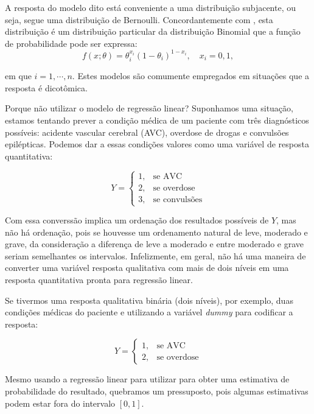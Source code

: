 \documentclass[
	12pt,				%
	openright,			%
	oneside,      %
	a4paper,			%
	english,			%
	french,				%
	spanish,			%
	brazil,				%
	]{abntex2}\usepackage[]{graphicx}\usepackage[table]{xcolor}
\theoremstyle{definition}
\begin{document}
A resposta do modelo dito está conveniente a uma distribuição subjacente, ou seja,
segue uma distribuição de Bernoulli. Concordantemente com \cite{bolfarine2001introduccao}, 
esta distribuição é um distribuição particular da distribuição Binomial que 
a função de probabilidade pode ser expressa:
\begin{equation}\label{bernoulli}
  f(x;\theta) = \theta_{i}^{x_i}(1 - \theta_{i})^{1 - x_i}, \quad x_i = 0,1,
\end{equation}

\noindent em que $i = 1,\cdots,n$. Estes modelos são comumente empregados em situações
que a resposta é dicotômica.

Porque não utilizar o modelo de regressão linear? Suponhamos uma situação, estamos 
tentando prever a condição médica de um paciente com três diagnósticos possíveis: 
acidente vascular cerebral (AVC), overdose de drogas e convulsões epilépticas. 
Podemos dar a essas condições valores como uma variável de resposta quantitativa:

$$Y = \left\{
\begin{array}{rcl}
1, & \textrm{se AVC}\\
2, & \textrm{se overdose}\\
3, & \textrm{se convulsões}
\end{array}
\right.$$

Com essa converssão implica um ordenação dos resultados possíveis de $Y$, mas 
não há ordenação, pois se houvesse um ordenamento natural de leve, moderado e 
grave, da consideração a diferença de leve a moderado e entre moderado e grave 
seriam semelhantes os intervalos. Infelizmente, em geral, não há uma maneira de converter
uma variável resposta qualitativa com mais de dois níveis em uma resposta quantitativa 
pronta para regressão linear.

Se tivermos uma resposta qualitativa binária (dois níveis), por exemplo, duas condições
médicas do paciente e utilizando a variável \textit{dummy} para codificar a resposta:

$$
Y = \left\{
\begin{array}{rcl}
1, & \textrm{se AVC}\\
2, & \textrm{se overdose}
\end{array}
\right.
$$

Mesmo usando a regressão linear para utilizar para obter uma estimativa de probabilidade
do resultado, quebramos um pressuposto, pois algumas estimativas podem estar fora do
intervalo $[0,1]$.
\end{document}
